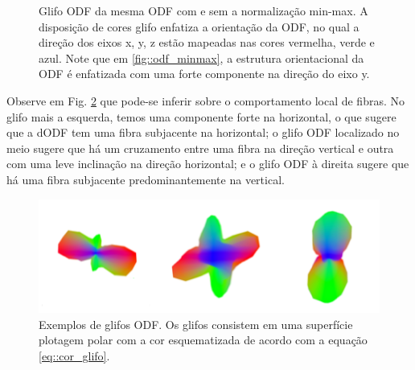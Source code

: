 \documentclass[
    12pt,                %
    oneside,            %
    a4paper,            %
    english,            %
    french,                %
    spanish,            %
    brazil                %
    ]{abntex2}
\begin{document}
\begin{figure}[ht]
\centering
\captionsetup[subfloat]{farskip=0pt,nearskip=0pt}
\centering
    \hspace{1em}
     \caption{Glifo ODF da mesma ODF com e sem a normalização min-max. A disposição de cores glifo enfatiza a orientação da ODF, no qual a direção dos eixos x, y, z estão mapeadas nas cores vermelha, verde e azul. Note que em \ref{fig::odf_minmax}, a estrutura orientacional da ODF é enfatizada com uma forte componente na direção do eixo y. %
     }
    \label{fig::normalizacao_min_max}
\end{figure}

Observe em Fig. \ref{fig::glifo_ilustrado} que pode-se inferir sobre o comportamento local de fibras. No glifo mais a esquerda, temos uma componente forte na horizontal, o que sugere que a dODF tem uma fibra subjacente na horizontal; o glifo ODF localizado no meio sugere que há um cruzamento entre uma fibra na direção vertical e outra com uma leve inclinação na direção horizontal; e o glifo ODF à direita sugere que há uma fibra subjacente predominantemente na vertical.



\begin{figure}[ht]

    \centering
    \includegraphics[width=.8\linewidth, angle=0]{figs/Esquema_Glifo/Glifos3Ex.png}
    \caption{Exemplos de glifos ODF. Os glifos consistem em uma superfície plotagem polar com a cor esquematizada de acordo com a equação \ref{eq::cor_glifo}.}
    \label{fig::glifo_ilustrado}
   \hspace{1pt}
\end{figure}
\end{document}
